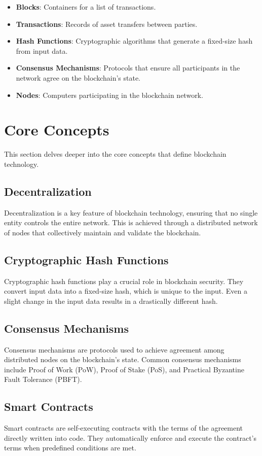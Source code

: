 \documentclass[12pt]{article}
\begin{document}
\begin{itemize}
    \item \textbf{Blocks}: Containers for a list of transactions.
    \item \textbf{Transactions}: Records of asset transfers between parties.
    \item \textbf{Hash Functions}: Cryptographic algorithms that generate a fixed-size hash from input data.
    \item \textbf{Consensus Mechanisms}: Protocols that ensure all participants in the network agree on the blockchain's state.
    \item \textbf{Nodes}: Computers participating in the blockchain network.
\end{itemize}

\section{Core Concepts}
This section delves deeper into the core concepts that define blockchain technology.

\subsection{Decentralization}
Decentralization is a key feature of blockchain technology, ensuring that no single entity controls the entire network. This is achieved through a distributed network of nodes that collectively maintain and validate the blockchain.

\subsection{Cryptographic Hash Functions}
Cryptographic hash functions play a crucial role in blockchain security. They convert input data into a fixed-size hash, which is unique to the input. Even a slight change in the input data results in a drastically different hash.

\subsection{Consensus Mechanisms}
Consensus mechanisms are protocols used to achieve agreement among distributed nodes on the blockchain's state. Common consensus mechanisms include Proof of Work (PoW), Proof of Stake (PoS), and Practical Byzantine Fault Tolerance (PBFT).

\subsection{Smart Contracts}
Smart contracts are self-executing contracts with the terms of the agreement directly written into code. They automatically enforce and execute the contract's terms when predefined conditions are met.
\end{document}
